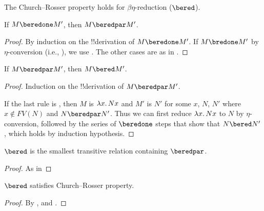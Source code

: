 \documentclass[../../../include/open-logic-section]{subfiles}
\begin{document}


The Church--Rosser property holds for
$\beta\eta$-reduction ($\bered$).

\begin{lem}
  If $M \beredone M'$, then $M \beredpar M'$.
\end{lem}

\begin{proof} 
  By induction on the !!{derivation} of $M \beredone M'$. If $M \bredone
  M'$ by $\eta$-conversion (i.e., ), we
  use . The other cases are as in
  .
\end{proof}


\begin{lem}
  If $M \beredpar M'$, then $M \bered M'$.
\end{lem}

\begin{proof} Induction on the !!{derivation} of $M \beredpar M'$.

  If the last rule is , then $M$ is
  $\lambd[x][Nx]$ and $M'$ is $N'$ for some $x$, $N$, $N'$ where $x
  \notin FV(N)$ and $N \beredpar N'$. Thus we can first reduce
  $\lambd[x][Nx]$ to $N$ by $\eta$-conversion, followed
  by the series of $\beredone$ steps that show that $N \bered N'$,
  which  holds by induction hypothesis.
\end{proof}


\begin{lem}
  $\bered$ is the smallest transitive relation containing $\beredpar$.
\end{lem}

\begin{proof}
  As in 
\end{proof}

\begin{thm}
  $\bered$ satisfies Church--Rosser property.
\end{thm}

\begin{proof}
  By ,  and .
\end{proof}
\end{document}
